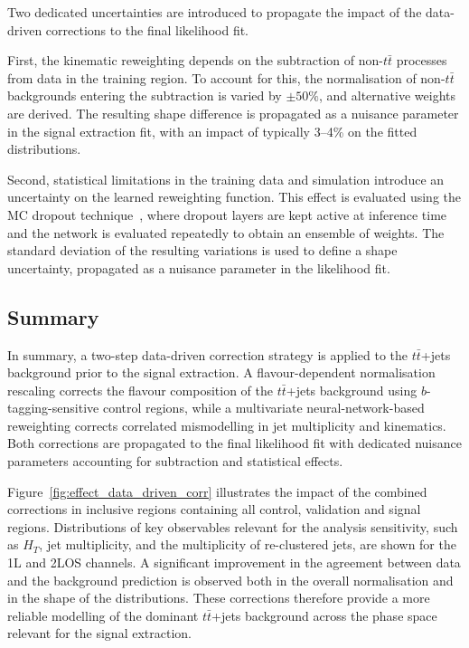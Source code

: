 Two dedicated uncertainties are introduced to propagate the impact of the data-driven corrections to the final likelihood fit.

First, the kinematic reweighting depends on the subtraction of non-$t\bar{t}$ processes from data in the training region.
To account for this, the normalisation of non-$t\bar{t}$ backgrounds entering the subtraction is varied by $\pm 50\%$, and alternative weights are derived.
The resulting shape difference is propagated as a nuisance parameter in the signal extraction fit, with an impact of typically 3--4\% on the fitted distributions.

Second, statistical limitations in the training data and simulation introduce an uncertainty on the learned reweighting function.
This effect is evaluated using the MC dropout technique~\cite{gal2016dropout}, where dropout layers are kept active at inference time and the network is evaluated repeatedly to obtain an ensemble of weights.
The standard deviation of the resulting variations is used to define a shape uncertainty, propagated as a nuisance parameter in the likelihood fit.

\subsection{Summary}
\label{sec:ttjets_modelling_summary}

In summary, a two-step data-driven correction strategy is applied to the $t\bar{t}$+jets background prior to the signal extraction.
A flavour-dependent normalisation rescaling corrects the flavour composition
of the $t\bar{t}$+jets background using $b$-tagging-sensitive control regions,
while a multivariate neural-network-based reweighting corrects correlated mismodelling in jet multiplicity and kinematics.
Both corrections are propagated to the final likelihood fit with dedicated nuisance parameters accounting for subtraction and statistical effects.

Figure~\ref{fig:effect_data_driven_corr} illustrates the impact of the combined corrections in inclusive regions containing all control, validation and signal regions.
Distributions of key observables relevant for the analysis sensitivity, such as $H_T$, jet multiplicity, and the multiplicity of re-clustered jets,
are shown for the 1L and 2LOS channels.
A significant improvement in the agreement between data and the background prediction is observed both in the overall normalisation and in the shape of the distributions.
These corrections therefore provide a more reliable modelling of the dominant $t\bar{t}$+jets background across the phase space relevant for the signal extraction.

